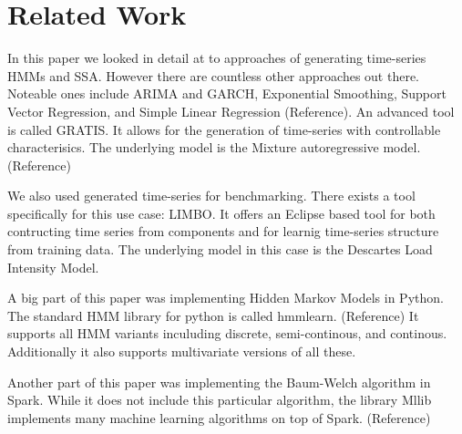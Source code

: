 \chapter{Related Work}\label{chapter:related}

In this paper we looked in detail at to approaches of generating time-series HMMs and SSA. However there are countless other approaches out there. Noteable ones include ARIMA and GARCH, Exponential Smoothing, Support Vector Regression, and Simple Linear Regression (Reference). An advanced tool is called GRATIS. It allows for the generation of time-series with controllable characterisics. The underlying model is the Mixture autoregressive model. (Reference)

We also used generated time-series for benchmarking. There exists a tool specifically for this use case: LIMBO. It offers an Eclipse based tool for both contructing time series from components and for learnig time-series structure from training data. The underlying model in this case is the Descartes Load Intensity Model. \parencite{v2014limbo}

A big part of this paper was implementing Hidden Markov Models in Python. The standard HMM library for python is called hmmlearn. (Reference) It supports all HMM variants inculuding discrete, semi-continous, and continous. Additionally it also supports multivariate versions of all these. 

Another part of this paper was implementing the Baum-Welch algorithm in Spark. While it does not include this particular algorithm, the library Mllib implements many machine learning algorithms on top of Spark. (Reference)